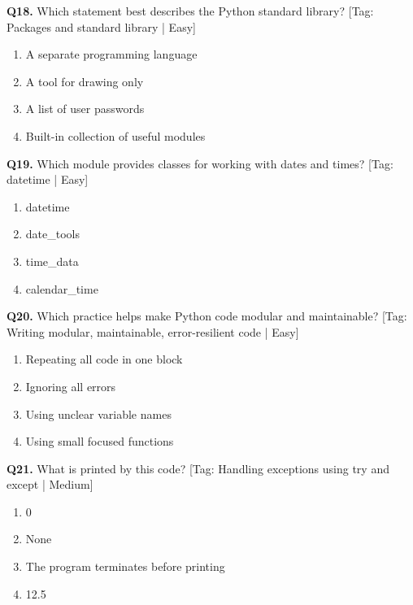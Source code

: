 \vspace{2mm}
\noindent\textbf{Q18.} Which statement best describes the Python standard library? \hfill [Tag: Packages and standard library | Easy]
\begin{enumerate}[label=(\alph*),topsep=2pt,itemsep=1pt,partopsep=0pt,parsep=0pt]
    \item {A separate programming language}
    \item {A tool for drawing only}
    \item {A list of user passwords}
    \item {Built-in collection of useful modules}
\end{enumerate}
\vspace{2mm}
\noindent\textbf{Q19.} Which module provides classes for working with dates and times? \hfill [Tag: datetime | Easy]
\begin{enumerate}[label=(\alph*),topsep=2pt,itemsep=1pt,partopsep=0pt,parsep=0pt]
    \item {datetime}
    \item {date\_tools}
    \item {time\_data}
    \item {calendar\_time}
\end{enumerate}
\vspace{2mm}
\noindent\textbf{Q20.} Which practice helps make Python code modular and maintainable? \hfill [Tag: Writing modular, maintainable, error-resilient code | Easy]
\begin{enumerate}[label=(\alph*),topsep=2pt,itemsep=1pt,partopsep=0pt,parsep=0pt]
    \item {Repeating all code in one block}
    \item {Ignoring all errors}
    \item {Using unclear variable names}
    \item {Using small focused functions}
\end{enumerate}
\vspace{2mm}
\noindent\textbf{Q21.} What is printed by this code? \hfill [Tag: Handling exceptions using try and except | Medium]
\begin{enumerate}[label=(\alph*),topsep=2pt,itemsep=1pt,partopsep=0pt,parsep=0pt]
    \item {0}
    \item {None}
    \item {The program terminates before printing}
    \item {12.5}
\end{enumerate}
